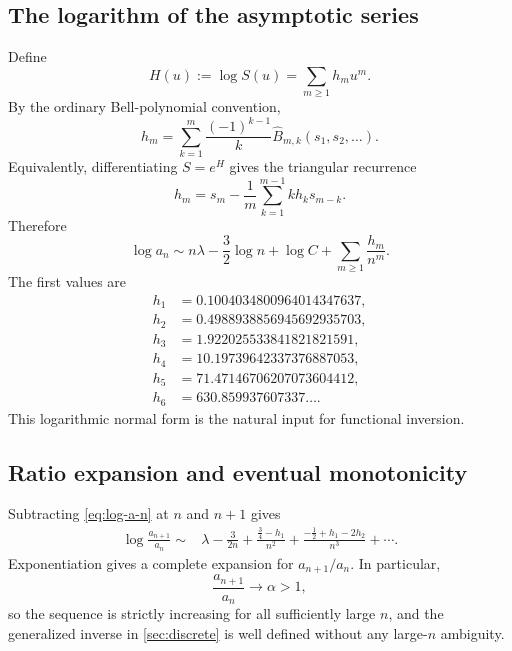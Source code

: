 \documentclass[11pt,oneside]{article}
\numberwithin{equation}{section}
\theoremstyle{plain}
\theoremstyle{definition}
\theoremstyle{remark}
\newcommand{\Bhat}{\widehat{B}}
\begin{document}
\subsection{The logarithm of the asymptotic series}

Define
\begin{equation}\label{eq:H-def}
 H(u):=\log S(u)=\sum_{m\ge1}h_mu^m.
\end{equation}
By the ordinary Bell-polynomial convention,
\begin{equation}\label{eq:h-bell}
 \boxed{
 h_m=\sum_{k=1}^{m}\frac{(-1)^{k-1}}{k}
 \Bhat_{m,k}(s_1,s_2,\ldots).}
\end{equation}
Equivalently, differentiating $S=e^H$ gives the triangular recurrence
\begin{equation}\label{eq:h-recurrence}
 h_m=s_m-\frac1m\sum_{k=1}^{m-1}k h_k s_{m-k}.
\end{equation}
Therefore
\begin{equation}\label{eq:log-a-n}
 \boxed{
 \log a_n\sim n\lambda-\frac32\log n+\log C
 +\sum_{m\ge1}\frac{h_m}{n^m}.}
\end{equation}
The first values are
\begin{align*}
 h_1&=0.1004034800964014347637,\\
 h_2&=0.4988938856945692935703,\\
 h_3&=1.922025533841821821591,\\
 h_4&=10.19739642337376887053,\\
 h_5&=71.47146706207073604412,\\
 h_6&=630.859937607337\ldots.
\end{align*}
This logarithmic normal form is the natural input for functional inversion.

\subsection{Ratio expansion and eventual monotonicity}

Subtracting \eqref{eq:log-a-n} at $n$ and $n+1$ gives
\begin{align}
 \log\frac{a_{n+1}}{a_n}
 \sim{}&\lambda-\frac{3}{2n}
 +\frac{\frac34-h_1}{n^2}
 +\frac{-\frac12+h_1-2h_2}{n^3}+\cdots.
 \label{eq:ratio-log}
\end{align}
Exponentiation gives a complete expansion for $a_{n+1}/a_n$.  In particular,
\begin{equation}\label{eq:ratio-limit}
 \frac{a_{n+1}}{a_n}\longrightarrow\alpha>1,
\end{equation}
so the sequence is strictly increasing for all sufficiently large $n$, and
the generalized inverse in \cref{sec:discrete} is well defined without any
large-$n$ ambiguity.
\end{document}
